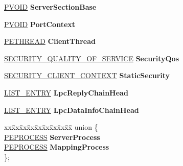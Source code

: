 \begin{DoxyCompactItemize}
\hyperlink{interfacevoid}{P\+V\+O\+ID} {\bfseries Server\+Section\+Base}
\item 
\mbox{\label{struct___l_p_c_p___p_o_r_t___o_b_j_e_c_t_a79d4bc38ef9e1ef6e212c2a99ccd8628}} 
\hyperlink{interfacevoid}{P\+V\+O\+ID} {\bfseries Port\+Context}
\item 
\mbox{\label{struct___l_p_c_p___p_o_r_t___o_b_j_e_c_t_a764300a97dffc0fe4f865bf7e7b48e33}} 
\hyperlink{struct___e_t_h_r_e_a_d}{P\+E\+T\+H\+R\+E\+AD} {\bfseries Client\+Thread}
\item 
\mbox{\label{struct___l_p_c_p___p_o_r_t___o_b_j_e_c_t_a5583b66882838b47aa3e5e224438e7f8}} 
\hyperlink{struct___s_e_c_u_r_i_t_y___q_u_a_l_i_t_y___o_f___s_e_r_v_i_c_e}{S\+E\+C\+U\+R\+I\+T\+Y\+\_\+\+Q\+U\+A\+L\+I\+T\+Y\+\_\+\+O\+F\+\_\+\+S\+E\+R\+V\+I\+CE} {\bfseries Security\+Qos}
\item 
\mbox{\label{struct___l_p_c_p___p_o_r_t___o_b_j_e_c_t_ab02e264e9a6981de7bdcb41e1fb3e2b6}} 
\hyperlink{struct___s_e_c_u_r_i_t_y___c_l_i_e_n_t___c_o_n_t_e_x_t}{S\+E\+C\+U\+R\+I\+T\+Y\+\_\+\+C\+L\+I\+E\+N\+T\+\_\+\+C\+O\+N\+T\+E\+XT} {\bfseries Static\+Security}
\item 
\mbox{\label{struct___l_p_c_p___p_o_r_t___o_b_j_e_c_t_a357c4c2a3948baa4e308bb77d5b3f1ca}} 
\hyperlink{struct___l_i_s_t___e_n_t_r_y}{L\+I\+S\+T\+\_\+\+E\+N\+T\+RY} {\bfseries Lpc\+Reply\+Chain\+Head}
\item 
\mbox{\label{struct___l_p_c_p___p_o_r_t___o_b_j_e_c_t_a8aa38675c688a9b5cca027639741cbc3}} 
\hyperlink{struct___l_i_s_t___e_n_t_r_y}{L\+I\+S\+T\+\_\+\+E\+N\+T\+RY} {\bfseries Lpc\+Data\+Info\+Chain\+Head}
\item 
\mbox{\label{struct___l_p_c_p___p_o_r_t___o_b_j_e_c_t_aaf1442ef696ec8899df68a4abe3d4051}} 
\begin{tabbing}
xx\=xx\=xx\=xx\=xx\=xx\=xx\=xx\=xx\=\kill
union \{\\
\>\hyperlink{struct___e_p_r_o_c_e_s_s}{PEPROCESS} {\bfseries ServerProcess}\\
\>\hyperlink{struct___e_p_r_o_c_e_s_s}{PEPROCESS} {\bfseries MappingProcess}\\
\}; \\


\end{tabbing}
\end{DoxyCompactItemize}
